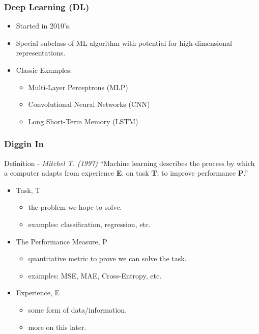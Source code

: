 \documentclass{beamer}
\begin{document}
\begin{frame}

    \frametitle{Deep Learning (DL)}

    \begin{itemize}
        \item Started in 2010's.
        \item Special subclass of ML algorithm with potential for high-dimensional representations.
        \item Classic Examples:
        \begin{itemize}
            \item Multi-Layer Perceptrons (MLP)
            \item Convolutional Neural Networks (CNN)
            \item Long Short-Term Memory (LSTM)
        \end{itemize}
    \end{itemize}

\end{frame}

\begin{frame}

    \frametitle{Diggin In}

    \begin{block}{Definition - \textit{Mitchel T. (1997)}}
        ``Machine learning describes the process by which a computer adapts
        from experience \textbf{E}, on task \textbf{T}, to improve
        performance \textbf{P}.''
    \end{block}

    \vskip20pt

    \begin{itemize}
        \item Task, T
        \begin{itemize}
            \item the problem we hope to solve.
            \item examples: classification, regression, etc.
        \end{itemize}
        \item The Performance Measure, P
        \begin{itemize}
            \item quantitative metric to prove we can solve the task.
            \item examples: MSE, MAE, Cross-Entropy, etc. 
        \end{itemize}
        \item Experience, E
            \begin{itemize}
            \item some form of data/information.
            \item more on this later.
        \end{itemize}
    \end{itemize}
    
\end{frame}
\end{document}
